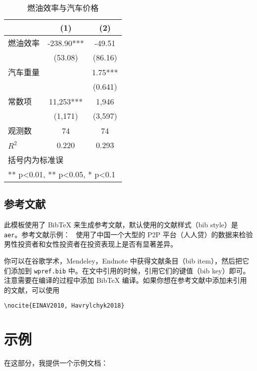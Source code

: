 \documentclass[lang=cn]{elegantpaper}
\begin{document}
\begin{table}[htbp]
  \small
  \centering
  \caption{燃油效率与汽车价格}
    \begin{tabular}{lcc}
    \toprule
                    &       (1)         &        (2)      \\
    \midrule
    燃油效率        &    -238.90***     &      -49.51     \\
                    &     (53.08)       &      (86.16)    \\
    汽车重量        &                   &        1.75***  \\
                    &                   &       (0.641)   \\
    常数项          &  11,253***        &    1,946       \\
                    &  (1,171)          &   (3,597)      \\
    观测数          &      74           &       74        \\
    $R^2$           &       0.220       &        0.293    \\
    \bottomrule
    \multicolumn{3}{l}{\scriptsize 括号内为标准误} \\
    \multicolumn{3}{l}{\scriptsize *** p<0.01, ** p<0.05, * p<0.1} \\
    \end{tabular}%
  \label{tab:reg}%
\end{table}%


\subsection{参考文献}
此模板使用了 Bib\TeX{} 来生成参考文献，默认使用的文献样式（bib style）是 \lstinline{aer}。参考文献示例：~\cite{Chen2018} 使用了中国一个大型的 P2P 平台（人人贷）的数据来检验男性投资者和女性投资者在投资表现上是否有显著差异。

你可以在谷歌学术，Mendeley，Endnote 中获得文献条目（bib item），然后把它们添加到 \lstinline{wpref.bib} 中。在文中引用的时候，引用它们的键值（bib key）即可。注意需要在编译的过程中添加 Bib\TeX{} 编译。如果你想在参考文献中添加未引用的文献，可以使用

\begin{lstlisting}
\nocite{EINAV2010, Havrylchyk2018}
\end{lstlisting}

\section{示例}
在这部分，我提供一个示例文档：
\end{document}
